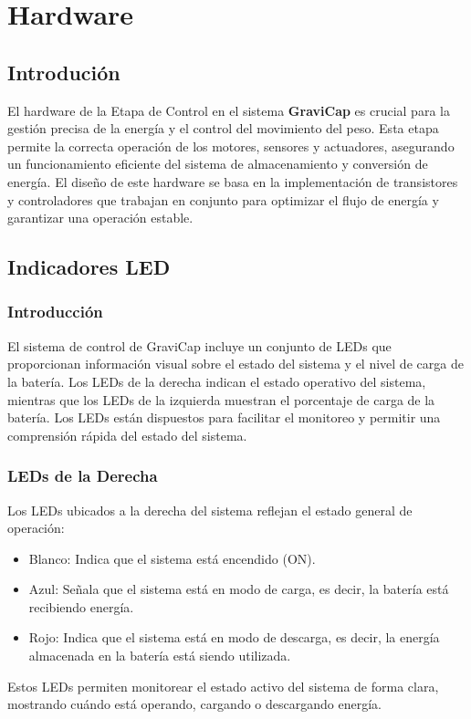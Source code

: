 \chapter{Hardware}
    
        \section{Introdución}
            El hardware de la Etapa de Control en el sistema \textcolor{dark_violet}{\textbf{GraviCap}} es crucial para la gestión precisa de la energía y el control del movimiento del peso. Esta etapa permite la correcta operación de los motores, sensores y actuadores, asegurando un funcionamiento eficiente del sistema de almacenamiento y conversión de energía. El diseño de este hardware se basa en la implementación de transistores y controladores que trabajan en conjunto para optimizar el flujo de energía y garantizar una operación estable.\par

        \section{Indicadores LED}
            \subsection{Introducción}
                El sistema de control de GraviCap incluye un conjunto de LEDs que proporcionan información visual sobre el estado del sistema y el nivel de carga de la batería. Los LEDs de la derecha indican el estado operativo del sistema, mientras que los LEDs de la izquierda muestran el porcentaje de carga de la batería. Los LEDs están dispuestos para facilitar el monitoreo y permitir una comprensión rápida del estado del sistema.\par
                
            \subsection{LEDs de la Derecha}
                Los LEDs ubicados a la derecha del sistema reflejan el estado general de operación:
                \begin{itemize} [label=•]
                    \setlength{\itemindent}{1.5em}
                    
                    \item Blanco: Indica que el sistema está encendido (ON).
                    \item Azul: Señala que el sistema está en modo de carga, es decir, la batería está recibiendo energía.
                    \item Rojo: Indica que el sistema está en modo de descarga, es decir, la energía almacenada en la batería está siendo utilizada.
                \end{itemize}
                Estos LEDs permiten monitorear el estado activo del sistema de forma clara, mostrando cuándo está operando, cargando o descargando energía.\par
                

